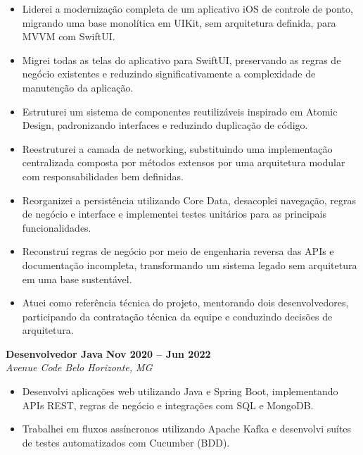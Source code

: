 \documentclass[10pt,a4paper]{article}
\newcommand{\job}[4]{%
  \textbf{#1} \hfill \textbf{#2}\\
  \textit{#3} \hfill \textit{#4}\\[-2pt]
}
\begin{document}
\begin{itemize}

\item Liderei a modernização completa de um aplicativo iOS de controle de ponto, migrando uma base monolítica em UIKit, sem arquitetura definida, para MVVM com SwiftUI.

\item Migrei todas as telas do aplicativo para SwiftUI, preservando as regras de negócio existentes e reduzindo significativamente a complexidade de manutenção da aplicação.

\item Estruturei um sistema de componentes reutilizáveis inspirado em Atomic Design, padronizando interfaces e reduzindo duplicação de código.

\item Reestruturei a camada de networking, substituindo uma implementação centralizada composta por métodos extensos por uma arquitetura modular com responsabilidades bem definidas.

\item Reorganizei a persistência utilizando Core Data, desacoplei navegação, regras de negócio e interface e implementei testes unitários para as principais funcionalidades.

\item Reconstruí regras de negócio por meio de engenharia reversa das APIs e documentação incompleta, transformando um sistema legado sem arquitetura em uma base sustentável.

\item Atuei como referência técnica do projeto, mentorando dois desenvolvedores, participando da contratação técnica da equipe e conduzindo decisões de arquitetura.

\end{itemize}

\job{Desenvolvedor Java}{Nov 2020 -- Jun 2022}{Avenue Code}{Belo Horizonte, MG}

\begin{itemize}

\item Desenvolvi aplicações web utilizando Java e Spring Boot, implementando APIs REST, regras de negócio e integrações com SQL e MongoDB.

\item Trabalhei em fluxos assíncronos utilizando Apache Kafka e desenvolvi suítes de testes automatizados com Cucumber (BDD).

\end{itemize}
\end{document}

